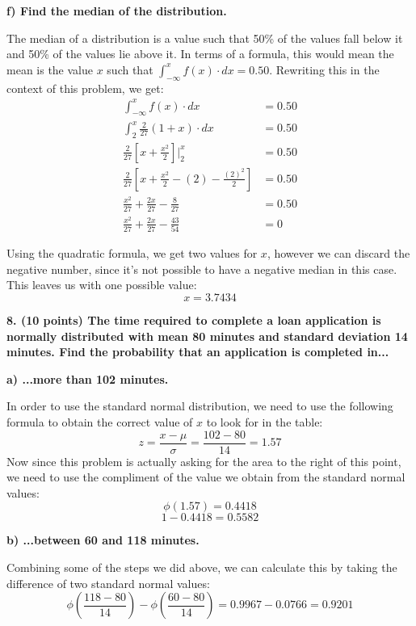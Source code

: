 \documentclass[12pt, letter]{article}
\begin{document}
\qquad \textbf{f) Find the median of the distribution.}
\begin{center}
	The median of a distribution is a value such that 50\% of the values fall below it and 50\% of the values lie above it. In terms of a formula, this would mean the mean is the value $x$ such that $\int_{-\infty}^{x} f(x) \cdot dx = 0.50$. Rewriting this in the context of this problem, we get:
	\begin{align*}
		\int_{-\infty}^{x} f(x) \cdot dx &= 0.50 \\
		\int_{2}^{x} \frac{2}{27}(1 + x) \cdot dx &= 0.50 \\
		\frac{2}{27}\left[x + \frac{x^{2}}{2}\right] \Bigg|_{2}^{x} &= 0.50 \\
		\frac{2}{27}\left[x + \frac{x^{2}}{2} - (2) - \frac{(2)^{2}}{2}\right] &= 0.50 \\
		\frac{x^{2}}{27} + \frac{2x}{27} - \frac{8}{27} &= 0.50 \\
		\frac{x^{2}}{27} + \frac{2x}{27} - \frac{43}{54} &= 0
	\end{align*}

	\pagebreak	
	
	Using the quadratic formula, we get two values for $x$, however we can discard the negative number, since it's not possible to have a negative median in this case. This leaves us with one possible value:
	$$x = \boxed{3.7434}$$
\end{center}

\textbf{8. (10 points) The time required to complete a loan application is normally distributed with mean 80 minutes and standard deviation 14 minutes. Find the probability that an application is completed in...}

\qquad \textbf{a) ...more than 102 minutes.}
\begin{center}
	In order to use the standard normal distribution, we need to use the following formula to obtain the correct value of $x$ to look for in the table:
	$$z = \frac{x - \mu}{\sigma} = \frac{102 - 80}{14} = 1.57$$
	Now since this problem is actually asking for the area to the right of this point, we need to use the compliment of the value we obtain from the standard normal values:
	$$\phi(1.57) = 0.4418$$
	$$1 - 0.4418 = \boxed{0.5582}$$
\end{center}

\qquad \textbf{b) ...between 60 and 118 minutes.}
\begin{center}
	Combining some of the steps we did above, we can calculate this by taking the difference of two standard normal values:
	$$\phi\left(\frac{118 - 80}{14}\right) - \phi\left(\frac{60 - 80}{14}\right) = 0.9967 - 0.0766 = \boxed{0.9201}$$
\end{center}
\end{document}
